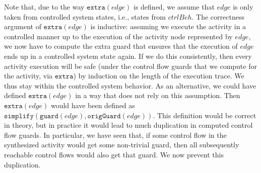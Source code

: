 \documentclass{article}
\theoremstyle{definition}
\begin{document}
Note that, due to the way $\texttt{extra}(\mathit{edge})$ is defined, we assume that $\mathit{edge}$ is only taken from controlled system states, i.e., states from $\mathit{ctrlBeh}$.
The correctness argument of $\texttt{extra}(\mathit{edge})$ is inductive: assuming we execute the activity in a controlled manner up to the execution of the activity node represented by $\mathit{edge}$, we now have to compute the extra guard that ensures that the execution of $\mathit{edge}$ ends up in a controlled system state again.
If we do this consistently, then every activity execution will be safe (under the control flow guards that we compute for the activity, via $\texttt{extra}$) by induction on the length of the execution trace.
We thus stay within the controlled system behavior.
As an alternative, we could have defined $\texttt{extra}(\mathit{edge})$ in a way that does not rely on this assumption.
Then $\texttt{extra}(\mathit{edge})$ would have been defined as $\texttt{simplify}(\texttt{guard}(\mathit{edge}), \texttt{origGuard}(\mathit{edge}))$.
This definition would be correct in theory, but in practice it would lead to much duplication in computed control flow guards.
In particular, we have seen that, if some control flow in the synthesized activity would get some non-trivial guard, then all subsequently reachable control flows would also get that guard.
We now prevent this duplication.
\end{document}
